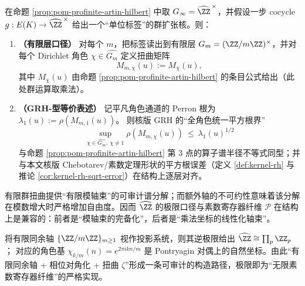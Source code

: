 \begin{corollary}\label{cor:pom-dirichlet-grh-twisted-radius}
在命题 \ref{prop:pom-profinite-artin-hilbert} 中取 \(G_\infty=\widehat{\ZZ}^{\,\times}\)，并假设一步 cocycle
\(
g:E(K)\to \widehat{\ZZ}^{\,\times}
\)
给出一个“单位标签”的群扩张核。则：
\begin{enumerate}
  \item \textbf{（有限层口径）} 对每个 \(m\)，把标签读出到有限层 \(G_m=(\ZZ/m\ZZ)^\times\)，并对每个 Dirichlet 角色 \(\chi\in\widehat{G_m}\) 定义扭曲矩阵
  \[
  M_{m,\chi}(u):=M_\chi(u),
  \]
  其中 \(M_\chi(u)\) 由命题 \ref{prop:pom-profinite-artin-hilbert} 的条目公式给出（此处群运算取乘法）。
  \item \textbf{（GRH-型等价表述）} 记平凡角色通道的 Perron 根为
  \(
  \lambda_1(u):=\rho(M_{m,1}(u))
  \)。
  则核版 GRH 的“全角色统一平方根界”
  \[
  \sup_{\chi\in\widehat{G_m},\ \chi\neq 1}\rho\!\left(M_{m,\chi}(u)\right)\ \le\ \lambda_1(u)^{1/2}
  \]
  与命题 \ref{prop:pom-profinite-artin-hilbert} 第 3 点的算子谱半径不等式同型；并与本文核版 Chebotarev/素数定理形状的平方根误差（定义 \ref{def:kernel-rh} 与推论 \ref{cor:kernel-rh-sqrt-error}）在结构上逐层对齐。
\end{enumerate}
\end{corollary}

\begin{remark}[从有限扭曲到无限寄存器]
有限群扭曲提供“有限模轴束”的可审计谱分解；而额外轴的不可约性意味着该分解在模数增大时严格增加自由度。因而 $\widehat{\ZZ}$ 的极限口径与素数寄存器纤维 $\mathcal{P}$ 在结构上是兼容的：前者是“模轴束的完备化”，后者是“乘法坐标的线性化轴束”。
\end{remark}

\begin{remark}[同余轴的逆极限与角色对角化]\label{rem:pom-congruence-invlimit}
将有限同余轴 $\{\ZZ/m\ZZ\}_{m\ge 1}$ 视作投影系统，则其逆极限给出
\(
\widehat{\ZZ}\cong\prod_{p}\ZZ_p
\)；
对应的角色基
\(
\chi_{k/m}(n)=e^{2\pi i kn/m}
\)
是 Pontryagin 对偶上的自然坐标。由此“有限同余轴 + 相位对角化 + 扭曲 $\zeta$”形成一条可审计的构造路径，极限即为“无限素数寄存器纤维”的严格实现。
\end{remark}

